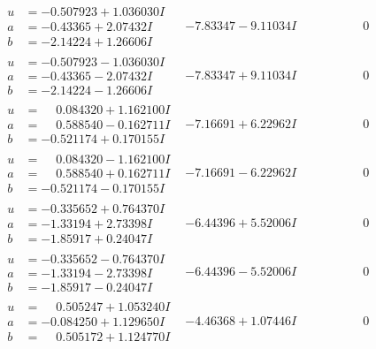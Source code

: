 \documentclass[1p]{elsarticle_modified}
\theoremstyle{definition}
\begin{document}
$$\begin{array}{c|c|c}
\begin{aligned}
u &= -0.507923 + 1.036030 I \\
a &= -0.43365 + 2.07432 I \\
b &= -2.14224 + 1.26606 I\end{aligned}
 & -7.83347 - 9.11034 I & \phantom{-0.000000 } 0 \\ \hline\begin{aligned}
u &= -0.507923 - 1.036030 I \\
a &= -0.43365 - 2.07432 I \\
b &= -2.14224 - 1.26606 I\end{aligned}
 & -7.83347 + 9.11034 I & \phantom{-0.000000 } 0 \\ \hline\begin{aligned}
u &= \phantom{-}0.084320 + 1.162100 I \\
a &= \phantom{-}0.588540 - 0.162711 I \\
b &= -0.521174 + 0.170155 I\end{aligned}
 & -7.16691 + 6.22962 I & \phantom{-0.000000 } 0 \\ \hline\begin{aligned}
u &= \phantom{-}0.084320 - 1.162100 I \\
a &= \phantom{-}0.588540 + 0.162711 I \\
b &= -0.521174 - 0.170155 I\end{aligned}
 & -7.16691 - 6.22962 I & \phantom{-0.000000 } 0 \\ \hline\begin{aligned}
u &= -0.335652 + 0.764370 I \\
a &= -1.33194 + 2.73398 I \\
b &= -1.85917 + 0.24047 I\end{aligned}
 & -6.44396 + 5.52006 I & \phantom{-0.000000 } 0 \\ \hline\begin{aligned}
u &= -0.335652 - 0.764370 I \\
a &= -1.33194 - 2.73398 I \\
b &= -1.85917 - 0.24047 I\end{aligned}
 & -6.44396 - 5.52006 I & \phantom{-0.000000 } 0 \\ \hline\begin{aligned}
u &= \phantom{-}0.505247 + 1.053240 I \\
a &= -0.084250 + 1.129650 I \\
b &= \phantom{-}0.505172 + 1.124770 I\end{aligned}
 & -4.46368 + 1.07446 I & \phantom{-0.000000 } 0 \\ \hline\begin{aligned}

\end{aligned}
\end{array}$$
\end{document}
